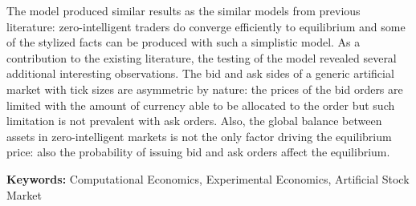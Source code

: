 The model produced similar results as the similar models from previous literature: zero-intelligent
traders do converge efficiently to equilibrium and some of the stylized facts can be produced
with such a simplistic model. As a contribution to the existing literature, the testing of the model 
revealed several additional interesting observations. 
The bid and ask sides of a generic artificial market with tick sizes are asymmetric by nature: the 
prices of the bid orders are limited with the amount of currency able to be allocated to the order 
but such limitation is not prevalent with ask orders. Also, the global balance between assets in 
zero-intelligent markets is not the only factor driving the equilibrium price: also the probability 
of issuing bid and ask orders affect the equilibrium.

\textbf{Keywords:} Computational Economics, Experimental Economics, Artificial Stock Market